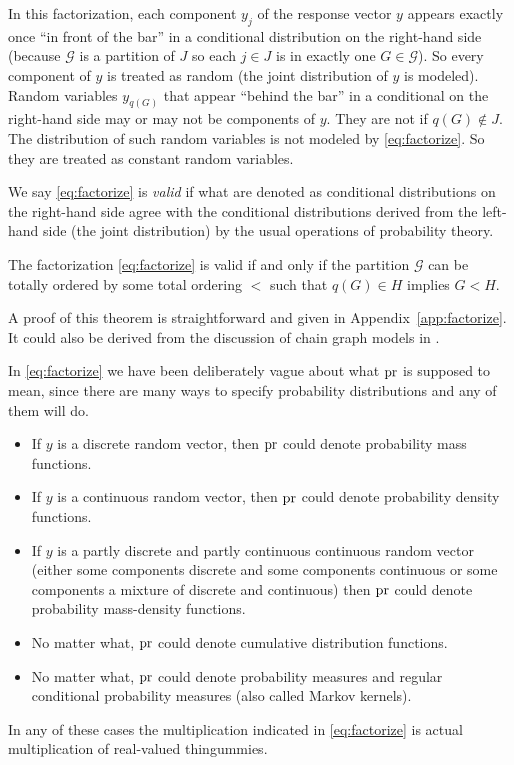 In this factorization, each component $y_j$ of the response vector $y$
appears exactly once ``in front of the bar'' in a conditional distribution on
the right-hand side (because $\mathcal{G}$ is a partition of $J$ so
each $j \in J$ is in exactly one $G \in \mathcal{G}$).
So every component of $y$ is treated as random (the joint distribution
of $y$ is modeled).
Random variables $y_{q(G)}$ that appear ``behind the bar'' in a conditional
on the right-hand side may or may not be components of $y$.  They are not
if $q(G) \notin J$.  The distribution of such random variables is not
modeled by \eqref{eq:factorize}.  So they are treated as constant random
variables.

We say \eqref{eq:factorize} is \emph{valid} if what are denoted as
conditional distributions on the right-hand side agree with the conditional
distributions derived from the left-hand side (the joint distribution) by
the usual operations of probability theory.
\begin{theorem} \label{th:factorize}
The factorization \eqref{eq:factorize} is valid if and only if
the partition $\mathcal{G}$ can be totally ordered
by some total ordering $<$ such that $q(G) \in H$ implies $G < H$.
\end{theorem}
A proof of this theorem is straightforward and given
in Appendix~\ref{app:factorize}.
It could also be derived from the discussion of chain graph models
in \citet[equation~3.23]{lauritzen}.

In \eqref{eq:factorize} we have been deliberately vague about what $\operatorname{pr}$ is
supposed to mean, since there are many ways to specify probability
distributions and any of them will do.
\begin{itemize}
\item If $y$ is a discrete random vector,
      then $\operatorname{pr}$ could denote probability mass functions.
\item If $y$ is a continuous random vector,
      then $\operatorname{pr}$ could denote probability density functions.
\item If $y$ is a partly discrete and partly continuous continuous
      random vector (either some components discrete and some components
      continuous or some components a mixture of discrete and continuous)
      then $\operatorname{pr}$ could denote probability mass-density functions.
\item No matter what, $\operatorname{pr}$ could denote cumulative distribution functions.
\item No matter what, $\operatorname{pr}$ could denote probability measures and
      regular conditional probability measures (also called Markov kernels).
\end{itemize}
In any of these cases the multiplication indicated in \eqref{eq:factorize}
is actual multiplication of real-valued thingummies.

